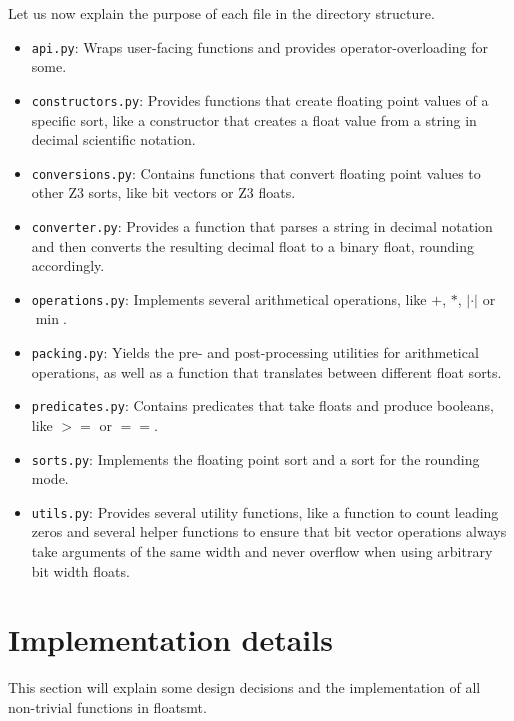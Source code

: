 \documentclass[a4paper,UKenglish,cleveref, autoref, thm-restate]{lipics-v2019}
\begin{document}
Let us now explain the purpose of each file in the directory structure.
\begin{itemize}
	\item \verb|api.py|: Wraps user-facing functions and provides operator-overloading for some.
	\item \verb|constructors.py|: Provides functions that create floating point values of a specific sort, like a constructor that creates a float value from a string in decimal scientific notation.
	\item \verb|conversions.py|: Contains functions that convert floating point values to other Z3 sorts, like bit vectors or Z3 floats.
	\item \verb|converter.py|: Provides a function that parses a string in decimal notation and then converts the resulting decimal float to a binary float, rounding accordingly.
	\item \verb|operations.py|: Implements several arithmetical operations, like $+$, $*$, $|\cdot|$ or $\min$.
	\item \verb|packing.py|: Yields the pre- and post-processing utilities for arithmetical operations, as well as a function that translates between different float sorts.
	\item \verb|predicates.py|: Contains predicates that take floats and produce booleans, like $>=$ or $==$.
	\item \verb|sorts.py|: Implements the floating point sort and a sort for the rounding mode.
	\item \verb|utils.py|: Provides several utility functions, like a function to count leading zeros and several helper functions to ensure that bit vector operations always take arguments of the same width and never overflow when using arbitrary bit width floats.
\end{itemize}


\section{Implementation details}
This section will explain some design decisions and the implementation of all non-trivial functions in floatsmt.
\end{document}
